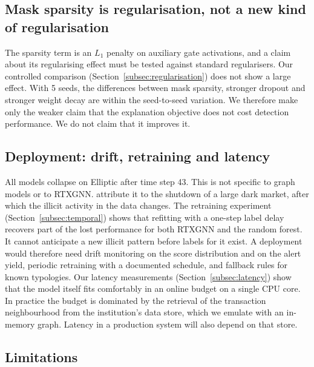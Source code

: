 \subsection{Mask sparsity is regularisation, not a new kind of regularisation}
\label{subsec:disc_reg}

The sparsity term is an $L_1$ penalty on auxiliary gate activations, and a claim about its regularising effect must be tested against standard regularisers. Our controlled comparison (Section~\ref{subsec:regularisation}) does not show a large effect. With 5 seeds, the differences between mask sparsity, stronger dropout and stronger weight decay are within the seed-to-seed variation. We therefore make only the weaker claim that the explanation objective does not cost detection performance. We do not claim that it improves it.

\subsection{Deployment: drift, retraining and latency}
\label{subsec:deployment}

All models collapse on Elliptic after time step 43. This is not specific to graph models or to RTXGNN. \citet{weber2019anti} attribute it to the shutdown of a large dark market, after which the illicit activity in the data changes. The retraining experiment (Section~\ref{subsec:temporal}) shows that refitting with a one-step label delay recovers part of the lost performance for both RTXGNN and the random forest. It cannot anticipate a new illicit pattern before labels for it exist. A deployment would therefore need drift monitoring on the score distribution and on the alert yield, periodic retraining with a documented schedule, and fallback rules for known typologies. Our latency measurements (Section~\ref{subsec:latency}) show that the model itself fits comfortably in an online budget on a single CPU core. In practice the budget is dominated by the retrieval of the transaction neighbourhood from the institution's data store, which we emulate with an in-memory graph. Latency in a production system will also depend on that store.

\subsection{Limitations}
\label{subsec:limitations}

